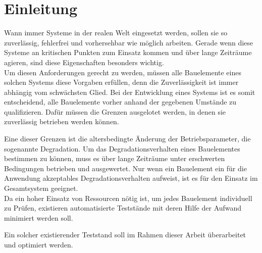 
\chapter{Einleitung}
\label{chapter_einleitung}

Wann immer Systeme in der realen Welt eingesetzt werden, sollen sie so zuverlässig, fehlerfrei und vorhersehbar wie möglich arbeiten. Gerade wenn diese Systeme an kritischen Punkten zum Einsatz kommen und über lange Zeiträume agieren, sind diese Eigenschaften besonders wichtig.\\
Um diesen Anforderungen gerecht zu werden, müssen alle Bauelemente eines solchen Systems diese Vorgaben erfüllen, denn die Zuverlässigkeit ist immer abhängig vom schwächsten Glied.
Bei der Entwicklung eines Systems ist es somit entscheidend, alle Bauelemente vorher anhand der gegebenen Umstände zu qualifizieren. Dafür müssen die Grenzen ausgelotet werden, in denen sie zuverlässig betrieben werden können.

Eine dieser Grenzen ist die altersbedingte Änderung der Betriebsparameter, die sogenannte Degradation.
Um das Degradationsverhalten eines Bauelementes bestimmen zu können, muss es über lange Zeiträume unter erschwerten Bedingungen betrieben und ausgewertet. Nur wenn ein Bauelement ein für die Anwendung akzeptables Degradationsverhalten aufweist, ist es für den Einsatz im Gesamtsystem geeignet.\\
Da ein hoher Einsatz von Ressourcen nötig ist, um jedes Bauelement individuell zu Prüfen, existieren automatisierte Teststände mit deren Hilfe der Aufwand minimiert werden soll.
 
Ein solcher existierender Teststand soll im Rahmen dieser Arbeit überarbeitet und optimiert werden.  

